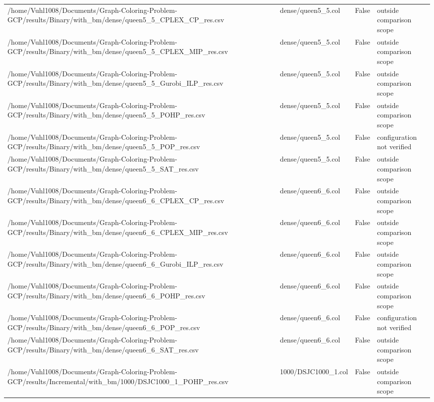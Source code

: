 \begin{table}[htbp]
\begin{tabular}{llll}
/home/Vuhl1008/Documents/Graph-Coloring-Problem-GCP/results/Binary/with\_bm/dense/queen5\_5\_CPLEX\_CP\_res.csv & dense/queen5\_5.col & False & outside comparison scope \\
/home/Vuhl1008/Documents/Graph-Coloring-Problem-GCP/results/Binary/with\_bm/dense/queen5\_5\_CPLEX\_MIP\_res.csv & dense/queen5\_5.col & False & outside comparison scope \\
/home/Vuhl1008/Documents/Graph-Coloring-Problem-GCP/results/Binary/with\_bm/dense/queen5\_5\_Gurobi\_ILP\_res.csv & dense/queen5\_5.col & False & outside comparison scope \\
/home/Vuhl1008/Documents/Graph-Coloring-Problem-GCP/results/Binary/with\_bm/dense/queen5\_5\_POHP\_res.csv & dense/queen5\_5.col & False & outside comparison scope \\
/home/Vuhl1008/Documents/Graph-Coloring-Problem-GCP/results/Binary/with\_bm/dense/queen5\_5\_POP\_res.csv & dense/queen5\_5.col & False & configuration not verified \\
/home/Vuhl1008/Documents/Graph-Coloring-Problem-GCP/results/Binary/with\_bm/dense/queen5\_5\_SAT\_res.csv & dense/queen5\_5.col & False & outside comparison scope \\
/home/Vuhl1008/Documents/Graph-Coloring-Problem-GCP/results/Binary/with\_bm/dense/queen6\_6\_CPLEX\_CP\_res.csv & dense/queen6\_6.col & False & outside comparison scope \\
/home/Vuhl1008/Documents/Graph-Coloring-Problem-GCP/results/Binary/with\_bm/dense/queen6\_6\_CPLEX\_MIP\_res.csv & dense/queen6\_6.col & False & outside comparison scope \\
/home/Vuhl1008/Documents/Graph-Coloring-Problem-GCP/results/Binary/with\_bm/dense/queen6\_6\_Gurobi\_ILP\_res.csv & dense/queen6\_6.col & False & outside comparison scope \\
/home/Vuhl1008/Documents/Graph-Coloring-Problem-GCP/results/Binary/with\_bm/dense/queen6\_6\_POHP\_res.csv & dense/queen6\_6.col & False & outside comparison scope \\
/home/Vuhl1008/Documents/Graph-Coloring-Problem-GCP/results/Binary/with\_bm/dense/queen6\_6\_POP\_res.csv & dense/queen6\_6.col & False & configuration not verified \\
/home/Vuhl1008/Documents/Graph-Coloring-Problem-GCP/results/Binary/with\_bm/dense/queen6\_6\_SAT\_res.csv & dense/queen6\_6.col & False & outside comparison scope \\
/home/Vuhl1008/Documents/Graph-Coloring-Problem-GCP/results/Incremental/with\_bm/1000/DSJC1000\_1\_POHP\_res.csv & 1000/DSJC1000\_1.col & False & outside comparison scope \\

\end{tabular}
\end{table}
